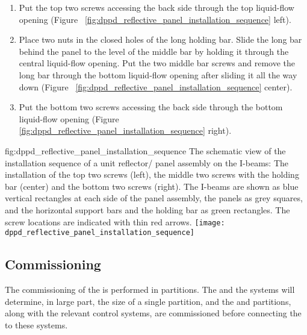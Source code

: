\begin{enumerate}
\item Put the top two screws accessing the back side through the top liquid-flow opening (Figure~ \ref{fig:dppd_reflective_panel_installation_sequence}  left).
\item Place two nuts in the closed holes of the long holding bar. Slide the long bar behind the panel to the level of the middle bar by holding it through the central liquid-flow opening. Put the two middle bar screws and remove the long bar through the bottom liquid-flow opening after sliding it all the way down (Figure~ \ref{fig:dppd_reflective_panel_installation_sequence} center).
\item Put the bottom two screws accessing the back side through the bottom liquid-flow opening (Figure~ \ref{fig:dppd_reflective_panel_installation_sequence}  right).
\end{enumerate}

\begin{dunefigure}{fig:dppd_reflective_panel_installation_sequence}
{The schematic view of the installation sequence of a unit reflector/ panel assembly on the  I-beams: The installation of the top two screws (left), the middle two screws with the holding bar (center) and the bottom two screws (right). The I-beams are shown as blue vertical rectangles at each side of the panel assembly, the panels as grey squares, and the horizontal support bars and the holding bar as green rectangles. The screw locations are indicated with thin red arrows.}
\texttt{[image: dppd\_reflective\_panel\_installation\_sequence]}
\end{dunefigure}

\subsection{Commissioning}
\label{subsec:dp-pds-commissioning}

The commissioning of the  is performed in partitions. The  and the  systems will determine, in large part, the size of a single partition, and the  and  partitions, along with the relevant control systems,  are commissioned before connecting the  to these systems.

